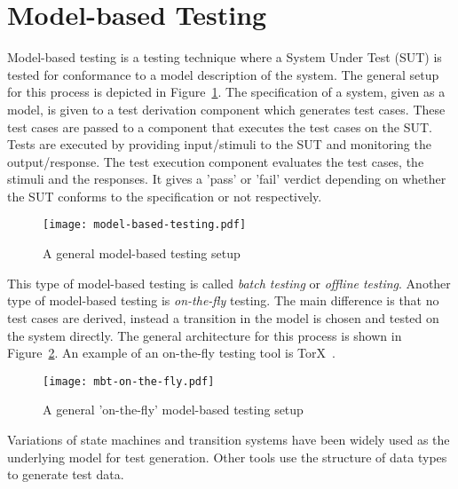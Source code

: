 \section{Model-based Testing}\label{sec:model_based_testing}

Model-based testing is a testing technique where a System Under Test (SUT) is tested for conformance to a model description of the system. The general setup for this process is depicted in Figure~\ref{fig:model_based_testing}. The specification of a system, given as a model, is given to a test derivation component which generates test cases. These test cases are passed to a component that executes the test cases on the SUT. Tests are executed by providing input/stimuli to the SUT and monitoring the output/response. The test execution component evaluates the test cases, the stimuli and the responses. It gives a 'pass' or 'fail' verdict depending on whether the SUT conforms to the specification or not respectively.

\begin{figure}[ht]
  \begin{center}
    \texttt{[image: model-based-testing.pdf]}
  \end{center}
  \caption{A general model-based testing setup}
  \label{fig:model_based_testing}
\end{figure}

This type of model-based testing is called \textit{batch testing} or \textit{offline testing}. Another type of model-based testing is \textit{on-the-fly} testing. The main difference is that no test cases are derived, instead a transition in the model is chosen and tested on the system directly. The general architecture for this process is shown in Figure~\ref{fig:model_based_testing_on_the_fly}. An example of an on-the-fly testing tool is TorX~\cite{Tretmans:TorX}.

\begin{figure}[ht]
  \begin{center}
    \texttt{[image: mbt-on-the-fly.pdf]}
  \end{center}
  \caption{A general 'on-the-fly' model-based testing setup}
  \label{fig:model_based_testing_on_the_fly}
\end{figure}

Variations of state machines and transition systems have been widely used as the underlying model for test generation. Other tools use the structure of data types to generate test data. 

